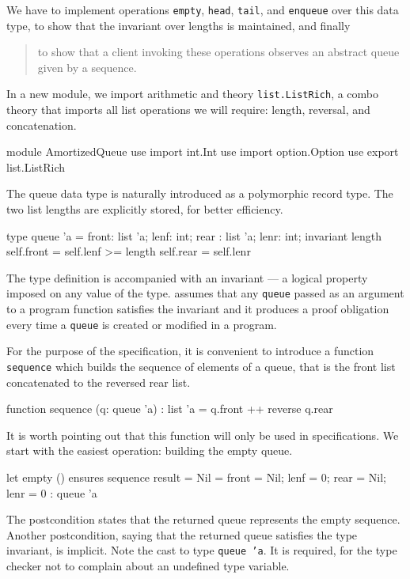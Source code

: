 We have to implement operations \texttt{empty}, \texttt{head},
\texttt{tail}, and \texttt{enqueue} over this data type,
to show that the invariant over lengths is maintained, and finally
\begin{quote}
  to show that a client invoking these operations
  observes an abstract queue given by a sequence.
\end{quote}
In a new module, we import arithmetic and theory
\texttt{list.ListRich}, a combo theory that imports all list
operations we will require: length, reversal, and concatenation.
\begin{whycode}
module AmortizedQueue
  use import int.Int
  use import option.Option
  use export list.ListRich
\end{whycode}
The queue data type is naturally introduced as a polymorphic record type.
The two list lengths are explicitly stored, for better efficiency.
\begin{whycode}
  type queue 'a = { front: list 'a; lenf: int;
                    rear : list 'a; lenr: int; }
  invariant {
    length self.front = self.lenf >= length self.rear = self.lenr }
\end{whycode}
The type definition is accompanied with an invariant ---
a logical property imposed on any value of the type.
\why assumes that any \texttt{queue} passed as an argument to
a program function satisfies the invariant and it produces
a proof obligation every time a \texttt{queue} is created
or modified in a program.

For the purpose of the specification, it is convenient to introduce a function
\texttt{sequence} which builds the sequence of elements of a queue, that
is the front list concatenated to the reversed rear list.
\begin{whycode}
  function sequence (q: queue 'a) : list 'a = q.front ++ reverse q.rear
\end{whycode}
It is worth pointing out that this function will only be used in
specifications.
We start with the easiest operation: building the empty queue.
\begin{whycode}
  let empty () ensures { sequence result = Nil }
  = { front = Nil; lenf = 0; rear = Nil; lenr = 0 } : queue 'a
\end{whycode}
The postcondition states that the returned queue represents
the empty sequence. Another postcondition, saying that the
returned queue satisfies the type invariant, is implicit.
Note the cast to type \texttt{queue 'a}. It is required, for the
type checker not to complain about an undefined type variable.

